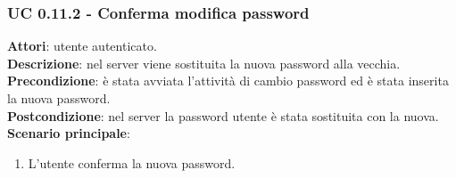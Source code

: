 	\subsubsection{UC 0.11.2 - Conferma modifica password}{
		\label{uc0.11.2}
		\textbf{Attori}: utente autenticato.\\
		\textbf{Descrizione}: nel server viene sostituita la nuova password alla vecchia. \\
		\textbf{Precondizione}: è stata avviata l'attività di cambio password ed è stata inserita la nuova password.	\\
		\textbf{Postcondizione}: nel server la password utente è stata sostituita con la nuova.	\\
		\textbf{Scenario principale}:
		\begin{enumerate}
			\item L'utente conferma la nuova password.
		\end{enumerate}		
		}